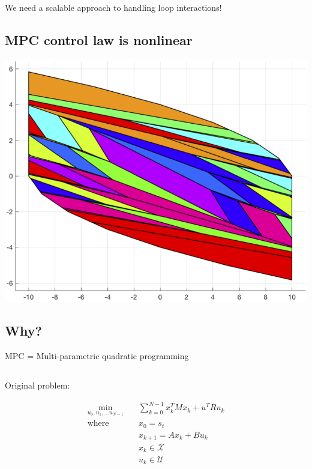 \documentclass[
  letterpaper,
  DIV=11,
  numbers=noendperiod,
  oneside]{scrartcl}
\begin{document}
We need a scalable approach to handling loop interactions!

\subsection{MPC control law is nonlinear}\label{mpcisnonlinear}

\includegraphics{figs/mpc_PWA.png}

\subsection{Why?}\label{why}

MPC = Multi-parametric quadratic programming

\subsection{}\label{section-58}

Original problem:

\begin{align}
\min_{u_0, u_1, \ldots u_{N-1}} \quad & \sum_{k=0}^{N-1} x_{k}^{T} M x_k +  u_{}^{T} R u_k \\
\text{where } \quad & x_0 = s_t \\
& x_{k+1} = A x_k + B u_k \\
& x_k \in \mathcal{X} \\
& u_k \in \mathcal{U}
\end{align}

\subsection{}\label{section-59}
\end{document}
